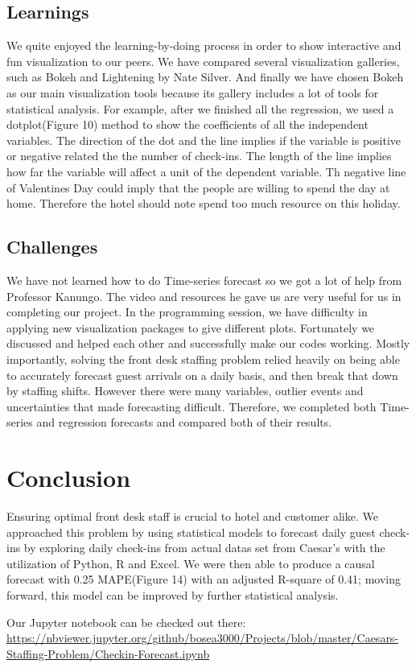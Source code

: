 \documentclass{article}
\begin{document}
\subsection{Learnings}

We quite enjoyed the learning-by-doing process in order to show interactive and fun visualization to our peers. We have compared several visualization galleries, such as Bokeh and Lightening by Nate Silver. And finally we have chosen Bokeh as our main visualization tools because its gallery includes a lot of tools for statistical analysis. For example, after we finished all the regression, we used a dotplot(Figure 10) method to show the coefficients of all the independent variables. The direction of the dot and the line implies if the variable is positive or negative related the the number of check-ins. The length of the line implies how far the variable will affect a unit of the dependent variable. Th negative line of Valentines Day could imply that the people are willing to spend the day at home. Therefore the hotel should note spend too much resource on this holiday.

\subsection{Challenges}

We have not learned how to do Time-series forecast so we got a lot of help from Professor Kanungo. The video and resources he gave us are very useful for us in completing our project. In the programming session, we have difficulty in applying new visualization packages to give different plots. Fortunately we discussed and helped each other and successfully make our codes working. Mostly importantly, solving the front desk staffing problem relied heavily on being able to accurately forecast guest arrivals on a daily basis, and then break that down by staffing shifts. However there were many variables, outlier events and uncertainties that made forecasting difficult. Therefore, we completed both Time-series and regression forecasts and compared both of their results.


\section{Conclusion}

Ensuring optimal front desk staff is crucial to hotel and customer alike. We approached this problem by using statistical models to forecast daily guest check-ins by exploring daily check-ins from actual datas set from Caesar’s with the utilization of Python, R and Excel. We were then able to produce a causal forecast with 0.25 MAPE(Figure 14) with an adjusted R-square of 0.41; moving forward, this model can be improved by further statistical analysis. 

Our Jupyter notebook can be checked out there: \url{https://nbviewer.jupyter.org/github/bosea3000/Projects/blob/master/Caesars-Staffing-Problem/Checkin-Forecast.ipynb} 
\end{document}
